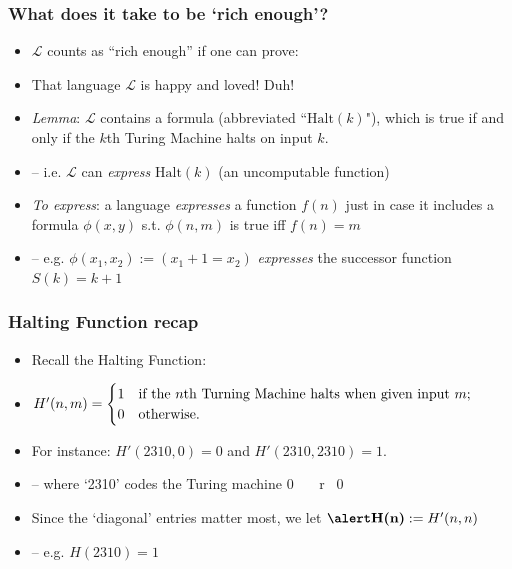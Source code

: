\begin{frame}
\frametitle{What does it take to be `rich enough'?}

\begin{itemize}[<+->]

\item $\mathcal{L}$ counts as ``rich enough'' if one can prove:

\item That language $\mathcal{L}$ is happy and loved! Duh! %

\item \emph{Lemma}: $\mathcal{L}$ contains a formula (abbreviated ``\(\mbox{Halt}(k)\)"), which is true if and only if the $k$th Turing Machine halts on input \(k\).

\item[] -- i.e. $\mathcal{L}$ can \emph{express} \(\mbox{Halt}(k)\) (an uncomputable function)

\item \emph{To express}: a language \emph{expresses} a function $f(n)$ just in case it includes a formula $\phi(x, y)$ s.t. $\phi(n, m)$ is true iff $f(n) = m$

\item[] -- e.g. $\phi(x_1, x_2) := (x_1 +1 = x_2) $ \textit{expresses} the successor function $S(k) = k+1$

\end{itemize}
\end{frame}

\begin{frame}
\frametitle{Halting Function recap}

\begin{itemize}[<+->]

\item Recall the Halting Function: 

\item $
H'(n,m) =
\begin{cases}
1 \text{\quad if the \(n\)th Turning Machine halts when given input \(m\);}\\
0 \text{\quad otherwise.}
\end{cases}$

\item For instance: $H'(2310, 0)=0$ and $H'(2310, 2310)=1$.

\item[] -- where `2310' codes the Turing machine 0 \, \ub \, \ub \, r \, 0

\item Since the `diagonal' entries matter most, we let $\emph{H(n)}:= H'(n,n)$

\item[] -- e.g. $H(2310)=1$


\end{itemize}
\end{frame}


